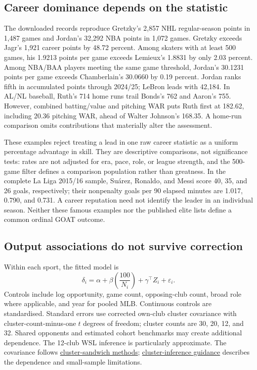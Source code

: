 \documentclass[11pt,letterpaper]{article}
\newcommand{\src}[2]{\href{#1}{#2}}
\begin{document}
\subsection{Career dominance depends on the statistic}

The downloaded records reproduce Gretzky's 2,857 NHL regular-season points in 1,487 games and Jordan's 32,292 NBA points in 1,072 games.
Gretzky exceeds Jagr's 1,921 career points by 48.72 percent.
Among skaters with at least 500 games, his 1.9213 points per game exceeds Lemieux's 1.8831 by only 2.03 percent.
Among NBA/BAA players meeting the same game threshold, Jordan's 30.1231 points per game exceeds Chamberlain's 30.0660 by 0.19 percent.
Jordan ranks fifth in accumulated points through 2024/25; LeBron leads with 42,184.
In AL/NL baseball, Ruth's 714 home runs trail Bonds's 762 and Aaron's 755.
However, combined batting/value and pitching WAR puts Ruth first at 182.62, including 20.36 pitching WAR, ahead of Walter Johnson's 168.35.
A home-run comparison omits contributions that materially alter the assessment.

These examples reject treating a lead in one raw career statistic as a uniform percentage advantage in skill.
They are descriptive comparisons, not significance tests: rates are not adjusted for era, pace, role, or league strength, and the 500-game filter defines a comparison population rather than greatness.
In the complete La Liga 2015/16 sample, Su\'arez, Ronaldo, and Messi score 40, 35, and 26 goals, respectively; their nonpenalty goals per 90 elapsed minutes are 1.017, 0.790, and 0.731.
A career reputation need not identify the leader in an individual season.
Neither these famous examples nor the published elite lists define a common ordinal GOAT outcome.

\subsection{Output associations do not survive correction}

Within each sport, the fitted model is
\begin{equation}
\delta_i=\alpha+\beta\left(\frac{100}{N_i}\right)+\gamma^\top Z_i+\varepsilon_i.
\label{eq:regression}
\end{equation}
Controls include log opportunity, game count, opposing-club count, broad role where applicable, and year for pooled MLB.
Continuous controls are standardised.
Standard errors use corrected own-club cluster covariance with cluster-count-minus-one $t$ degrees of freedom; cluster counts are 30, 20, 12, and 32.
Shared opponents and estimated cohort benchmarks may create additional dependence.
The 12-club WSL inference is particularly approximate.
The covariance follows \src{https://www.statsmodels.org/stable/generated/statsmodels.stats.sandwich_covariance.cov_cluster_2groups.html}{cluster-sandwich methods}; \src{https://cameron.econ.ucdavis.edu/research/Cameron_Miller_JHR_2015_February.pdf}{cluster-inference guidance} describes the dependence and small-sample limitations.
\end{document}
